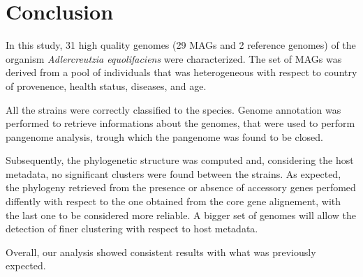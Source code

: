 \clearpage
\section*{Conclusion}

In this study, 31 high quality genomes (29 MAGs and 2 reference genomes)
of the organism \emph{Adlercreutzia equolifaciens} were characterized.
The set of MAGs was derived from a pool of individuals that was heterogeneous
with respect to country of provenence, health status, diseases, and age. 

All the strains were correctly classified to the species. 
Genome annotation was performed to retrieve informations about the genomes, that 
were used to perform pangenome analysis, trough which the pangenome was found to be closed.

Subsequently, the phylogenetic structure was computed and, considering the host metadata,
no significant clusters were found between the strains. As expected, the phylogeny 
retrieved from the presence or absence of accessory genes perfomed diffently with respect
to the one obtained from the core gene alignement, with the last one to be considered
more reliable. A bigger set of genomes will allow the detection of finer clustering with respect
to host metadata.

Overall, our analysis showed consistent results with what was previously expected. 







